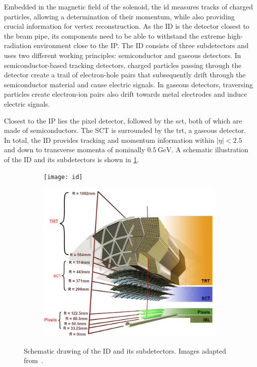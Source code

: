 Embedded in the magnetic field of the solenoid, the \gls{id} measures tracks of charged particles, allowing a determination of their momentum, while also providing crucial information for vertex reconstruction. As the ID is the detector closest to the beam pipe, its components need to be able to withstand the extreme high-radiation environment close to the IP. The ID consists of three subdetectors and uses two different working principles: semiconductor and gaseous detectors. In semiconductor-based tracking detectors, charged particles passing through the detector create a trail of electron-hole pairs that subsequently drift through the semiconductor material and cause electric signals. In gaseous detectors, traversing particles create electron-ion pairs also drift towards metal electrodes and induce electric signals.

 Closest to the IP lies the pixel detector, followed by the \gls{sct}, both of which are made of semiconductors. The SCT is surrounded by the \gls{trt}, a gaseous detector. In total, the ID provides tracking and momentum information within $\vert\eta\vert < 2.5$ and down to transverse momenta of nominally $\SI{0.5}{\GeV}$. A schematic illustration of the ID and its subdetectors is shown in \cref{fig:ID_schematic}. 

\begin{figure}
	\centering
	\begin{subfigure}[b]{0.45\linewidth}
		\centering\texttt{[image: id]}
	\end{subfigure}%
	\begin{subfigure}[b]{0.45\linewidth}
		\centering\includegraphics[width=\textwidth]{ibl}
	\end{subfigure}%
	\caption{Schematic drawing of the ID and its subdetectors. Images adapted from~\cite{Pequenao:1095926, Potamianos:2209070}.}\label{fig:ID_schematic}
\end{figure}

